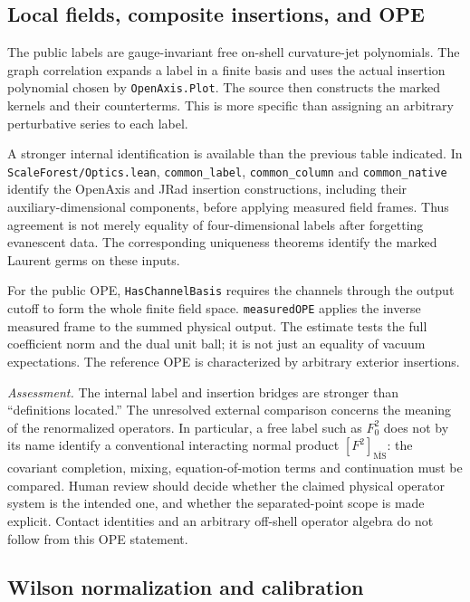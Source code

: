 \documentclass[11pt]{article}
\newcommand{\MS}{\overline{\mathrm{MS}}}
\newcommand{\code}[1]{{\small\nolinkurl{#1}}}
\begin{document}
\subsection{Local fields, composite insertions, and OPE}

The public labels are gauge-invariant free on-shell curvature-jet
polynomials. The graph correlation expands a label in a finite basis and
uses the actual insertion polynomial chosen by \code{OpenAxis.Plot}.
The source then constructs the marked kernels and their counterterms.
This is more specific than assigning an arbitrary perturbative series to
each label.

A stronger internal identification is available than the previous table
indicated. In \code{ScaleForest/Optics.lean}, \code{common_label},
\code{common_column} and \code{common_native} identify the OpenAxis and
JRad insertion constructions, including their auxiliary-dimensional
components, before applying measured field frames. Thus agreement is not
merely equality of four-dimensional labels after forgetting evanescent
data. The corresponding uniqueness theorems identify the marked Laurent
germs on these inputs.

For the public OPE, \code{HasChannelBasis} requires the channels through
the output cutoff to form the whole finite field space. \code{measuredOPE}
applies the inverse measured frame to the summed physical output.
The estimate tests the full coefficient norm and the dual unit ball;
it is not just an equality of vacuum expectations. The reference OPE is
characterized by arbitrary exterior insertions.

\emph{Assessment.} The internal label and insertion bridges are stronger
than ``definitions located.'' The unresolved external comparison concerns
the meaning of the renormalized operators. In particular, a free label
such as $F_0^2$ does not by its name identify a conventional interacting
normal product $[F^2]_{\MS}$: the covariant completion, mixing, equation-of-motion
terms and continuation must be compared. Human review should decide whether
the claimed physical operator system is the intended one, and whether the
separated-point scope is made explicit. Contact identities and an arbitrary
off-shell operator algebra do not follow from this OPE statement.

\subsection{Wilson normalization and calibration}
\end{document}

